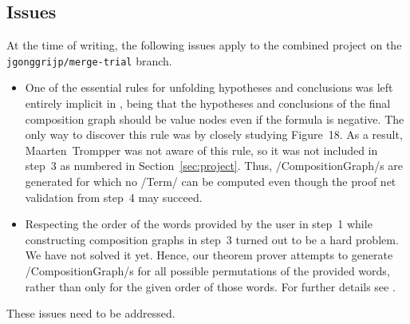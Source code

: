 \documentclass[12pt,a4paper]{article}
\begin{document}
\subsection{Issues}\label{sub:issues}

At the time of writing, the following issues apply to the combined project on the \texttt{jgonggrijp/merge-trial} branch.
\begin{itemize}
    \item One of the essential rules for unfolding hypotheses and conclusions was left entirely implicit in \cite{mm12}, being that the hypotheses and conclusions of the final composition graph should be value nodes even if the formula is negative. The only way to discover this rule was by closely studying Figure~18. As a result, Maarten~Trompper was not aware of this rule, so it was not included in step~3 as numbered in Section~\ref{sec:project}. Thus, \hs/CompositionGraph/s are generated for which no \hs/Term/ can be computed even though the proof net validation from step~4 may succeed.
    \item Respecting the order of the words provided by the user in step~1 while constructing composition graphs in step~3 turned out to be a hard problem. We have not solved it yet. Hence, our theorem prover attempts to generate \hs/CompositionGraph/s for all possible permutations of the provided words, rather than only for the given order of those words. For further details see \cite{maarten}.
\end{itemize}
These issues need to be addressed.
\end{document}
